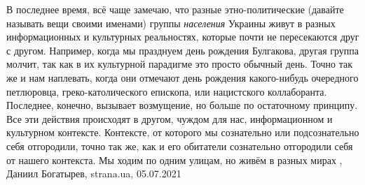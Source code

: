 В последнее время, всё чаще замечаю, что разные этно-политические (давайте
называть вещи своими именами) группы \emph{населения} Украины живут в разных
информационных и культурных реальностях, которые почти не пересекаются друг с
другом. Например, когда мы празднуем день рождения Булгакова, другая группа
молчит, так как в их культурной парадигме это просто обычный день. Точно так же
и нам наплевать, когда они отмечают день рождения какого-нибудь очередного
петлюровца, греко-католического епископа, или нацистского коллаборанта.
Последнее, конечно, вызывает возмущение, но больше по остаточному принципу. Все
эти действия происходят в другом, чуждом для нас, информационном и культурном
контексте. Контексте, от которого мы сознательно или подсознательно себя
отгородили, точно так же, как и его обитатели сознательно отгородили себя от
нашего контекста. Мы ходим по одним улицам, но живём в разных мирах
, 
Даниил Богатырев, strana.ua, 05.07.2021
